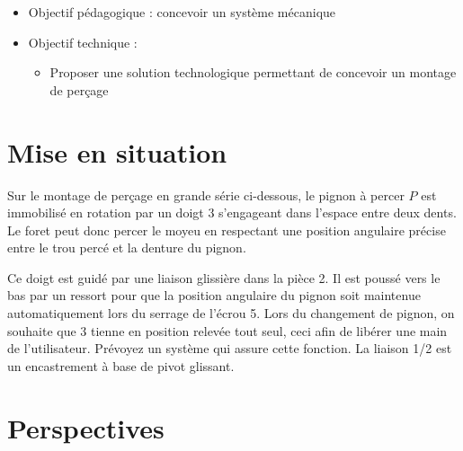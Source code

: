 \documentclass[11pt,oneside]{article}
\begin{document}
\begin{contexte}
\begin{itemize}
\item Objectif pédagogique : concevoir un système mécanique
\item Objectif technique : 
\begin{itemize}
\item Proposer une solution technologique permettant de concevoir un montage de perçage
\end{itemize}
\end{itemize}
\end{contexte}

\section*{Mise en situation}

Sur le montage de perçage en grande série ci-dessous, le pignon à percer $P$ est immobilisé en rotation par un doigt 3 s'engageant dans l'espace entre deux dents. Le foret peut donc percer le moyeu en respectant une position angulaire précise entre le trou percé et la denture du pignon. 

Ce doigt est guidé par une liaison glissière dans la pièce 2. Il est poussé vers le bas par un ressort pour que la position angulaire du pignon soit maintenue automatiquement lors du serrage de l'écrou 5. Lors du changement de pignon, on souhaite que 3 tienne en position relevée tout seul, ceci afin de libérer une main de l'utilisateur. Prévoyez un système qui assure cette fonction. La liaison 1/2 est un encastrement à base de pivot glissant. 



\section*{Perspectives}
\end{document}
